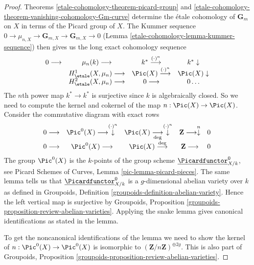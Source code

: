 \begin{proof}
Theorems \ref{etale-cohomology-theorem-picard-group} and
\ref{etale-cohomology-theorem-vanishing-cohomology-Gm-curve}
determine the \'etale cohomology of $\mathbf{G}_m$ on $X$
in terms of the Picard group of $X$.
The Kummer sequence $0\to \mu_{n, X} \to \mathbf{G}_{m, X}
\to \mathbf{G}_{m, X}\to 0$ (Lemma \ref{etale-cohomology-lemma-kummer-sequence})
then gives us the long exact cohomology sequence
$$
\begin{array}{cccc}0 \longrightarrow & \mu_n(k) \longrightarrow & k^* \overset{(\cdot)^n}{\longrightarrow} & k^* \downarrow \\  & H_\etale^1(X, \mu_n) \longrightarrow & \Pic(X) \overset{(\cdot)^n}{\longrightarrow} & \Pic(X) \downarrow \\  & H_\etale^2(X, \mu_n) \longrightarrow & 0 \longrightarrow & 0 \ldots\end{array}
$$
The $n$th power map $k^* \to k^*$ is surjective since $k$ is algebraically
closed. So we need to compute the kernel and cokernel of the map
$n : \Pic(X) \to \Pic(X)$. Consider the commutative diagram with
exact rows
$$
\begin{array}{ccccc}0 \longrightarrow & \Pic^0(X) \longrightarrow\overset{(\cdot)^n}{\downarrow} & \Pic(X) \underset{\deg}{\longrightarrow}\overset{(\cdot)^n}{\downarrow} & \mathbf{Z} \longrightarrow\overset{n}{\downarrow} & 0 \\ 0 \longrightarrow & \Pic^0(X) \longrightarrow & \Pic(X) \overset{\deg}{\longrightarrow} & \mathbf{Z} \longrightarrow & 0\end{array}
$$
The group $\Pic^0(X)$ is the $k$-points of
the group scheme $\underline{\Picardfunctor}^0_{X/k}$, see
Picard Schemes of Curves, Lemma \ref{pic-lemma-picard-pieces}.
The same lemma tells us that $\underline{\Picardfunctor}^0_{X/k}$
is a $g$-dimensional abelian variety over $k$ as defined in
Groupoids, Definition \ref{groupoids-definition-abelian-variety}.
Hence the left vertical map is surjective by
Groupoids, Proposition \ref{groupoids-proposition-review-abelian-varieties}.
Applying the snake lemma gives canonical identifications as stated
in the lemma.

\medskip\noindent
To get the noncanonical identifications of the lemma we need to
show the kernel of $n : \Pic^0(X) \to \Pic^0(X)$
is isomorphic to $(\mathbf{Z}/n\mathbf{Z})^{\oplus 2g}$.
This is also part of Groupoids, Proposition
\ref{groupoids-proposition-review-abelian-varieties}.
\end{proof}

